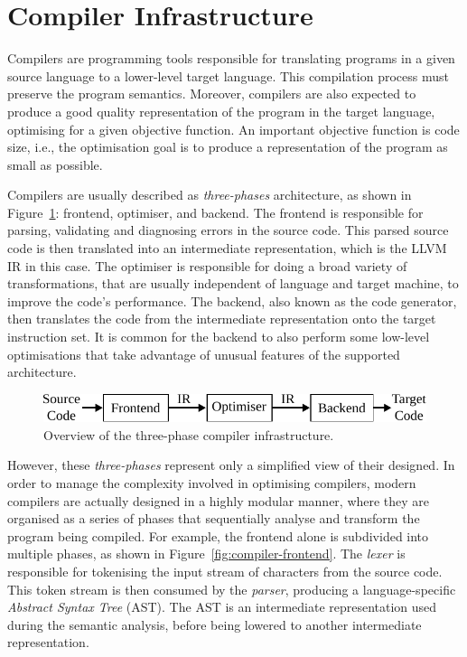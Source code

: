 
\section{Compiler Infrastructure}

Compilers are programming tools responsible for translating programs in a given source language to a lower-level target language.
This compilation process must preserve the program semantics.
Moreover, compilers are also expected to produce a good quality representation of the program in the target language, optimising for a given objective function.
An important objective function is code size, i.e., the optimisation goal is to produce a representation of the program as small as possible.

Compilers are usually described as \textit{three-phases} architecture, as shown in Figure~\ref{fig:3-phase-compiler}: frontend, optimiser, and backend.
The frontend is responsible for parsing, validating and diagnosing errors in the source code.
This parsed source code is then translated into an intermediate representation, which is the LLVM IR in this case.
The optimiser is responsible for doing a broad variety of transformations, that are usually independent of language and target machine, to improve the code's performance.
The backend, also known as the code generator, then translates the code from the intermediate representation onto the target instruction set.
It is common for the backend to also perform some low-level optimisations that take advantage of unusual features of the supported architecture.

\begin{figure}[h]
  \centering
  \includegraphics[scale=0.9]{src/background/figs/3-phase-compiler.pdf}
  \caption{Overview of the three-phase compiler infrastructure.}
  \label{fig:3-phase-compiler}
\end{figure}

However, these \textit{three-phases} represent only a simplified view of their designed.
In order to manage the complexity involved in optimising compilers, modern compilers are actually designed in a highly modular manner, where they are organised as a series of phases that sequentially analyse and transform the program being compiled.
For example, the frontend alone is subdivided into multiple phases, as shown in Figure~\ref{fig:compiler-frontend}.
The \textit{lexer} is responsible for tokenising the input stream of characters from the source code.
This token stream is then consumed by the \textit{parser}, producing a language-specific \textit{Abstract Syntax Tree} (AST).
The AST is an intermediate representation used during the semantic analysis, before being lowered to another intermediate representation.

